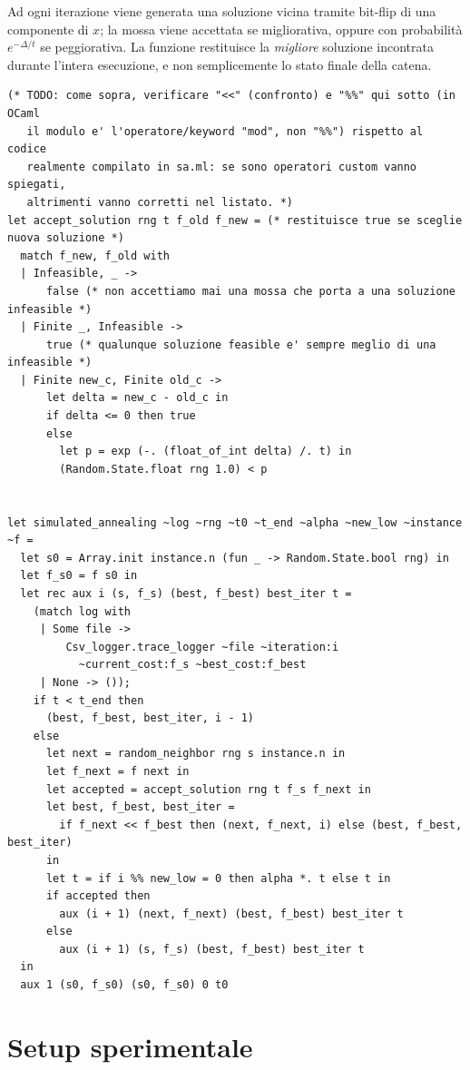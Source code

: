 \documentclass[11pt,a4paper]{article}
\begin{document}
Ad ogni iterazione viene generata una soluzione vicina tramite bit-flip di una componente di $x$; la mossa viene accettata se migliorativa, oppure con probabilità $e^{-\Delta / t}$ se peggiorativa. La funzione restituisce la \emph{migliore} soluzione incontrata durante l'intera esecuzione, e non semplicemente lo stato finale della catena.

\begin{lstlisting}[caption={Codice principale del Simulated Annealing.}, label={lst:sa_code}]
(* TODO: come sopra, verificare "<<" (confronto) e "%%" qui sotto (in OCaml
   il modulo e' l'operatore/keyword "mod", non "%%") rispetto al codice
   realmente compilato in sa.ml: se sono operatori custom vanno spiegati,
   altrimenti vanno corretti nel listato. *)
let accept_solution rng t f_old f_new = (* restituisce true se sceglie nuova soluzione *)
  match f_new, f_old with
  | Infeasible, _ ->
      false (* non accettiamo mai una mossa che porta a una soluzione infeasible *)
  | Finite _, Infeasible ->
      true (* qualunque soluzione feasible e' sempre meglio di una infeasible *)
  | Finite new_c, Finite old_c ->
      let delta = new_c - old_c in
      if delta <= 0 then true
      else
        let p = exp (-. (float_of_int delta) /. t) in
        (Random.State.float rng 1.0) < p


let simulated_annealing ~log ~rng ~t0 ~t_end ~alpha ~new_low ~instance ~f =
  let s0 = Array.init instance.n (fun _ -> Random.State.bool rng) in
  let f_s0 = f s0 in
  let rec aux i (s, f_s) (best, f_best) best_iter t =
    (match log with
     | Some file ->
         Csv_logger.trace_logger ~file ~iteration:i
           ~current_cost:f_s ~best_cost:f_best
     | None -> ());
    if t < t_end then
      (best, f_best, best_iter, i - 1)
    else
      let next = random_neighbor rng s instance.n in
      let f_next = f next in
      let accepted = accept_solution rng t f_s f_next in
      let best, f_best, best_iter =
        if f_next << f_best then (next, f_next, i) else (best, f_best, best_iter)
      in
      let t = if i %% new_low = 0 then alpha *. t else t in
      if accepted then
        aux (i + 1) (next, f_next) (best, f_best) best_iter t
      else
        aux (i + 1) (s, f_s) (best, f_best) best_iter t
  in
  aux 1 (s0, f_s0) (s0, f_s0) 0 t0
\end{lstlisting}

\section{Setup sperimentale}
\end{document}
